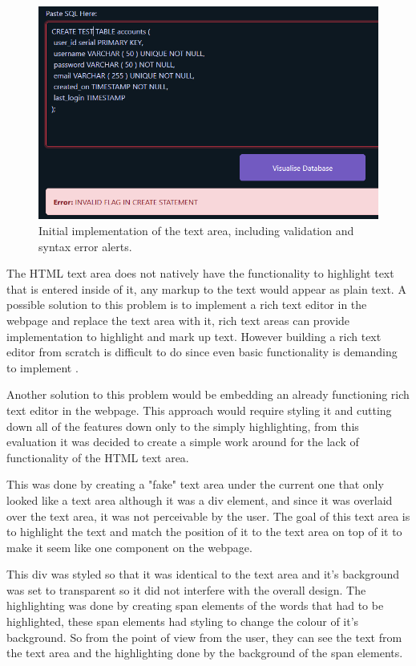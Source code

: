 \begin{figure}[h!]
	\centering
	\includegraphics[width=\textwidth]{textArea}
	\caption{Initial implementation of the text area, including validation and syntax error alerts.}
	\label{fig:textArea}
\end{figure}

The HTML text area does not natively have the functionality to highlight text that is entered inside of it, any markup to the text would appear as plain text. A possible solution to this problem is to implement a rich text editor in the webpage and replace the text area with it, rich text areas can provide implementation to highlight and mark up text. However building a rich text editor from scratch is difficult to do since even basic functionality is demanding to implement \cite{highlightText}.

Another solution to this problem would be embedding an already functioning rich text editor in the webpage. This approach would require styling it and cutting down all of the features down only to the simply highlighting, from this evaluation it was decided to create a simple work around for the lack of functionality of the HTML text area. 

This was done by creating a "fake" text area under the current one that only looked like a text area although it was a div element, and since it was overlaid over the text area, it was not perceivable by the user. The goal of this text area is to highlight the text and match the position of it to the text area on top of it to make it seem like one component on the webpage. 

This div was styled so that it was identical to the text area and it's background was set to transparent so it did not interfere with the overall design. The highlighting was done by creating span elements of the words that had to be highlighted, these span elements had styling to change the colour of it's background. So from the point of view from the user, they can see the text from the text area and the highlighting done by the background of the span elements.

